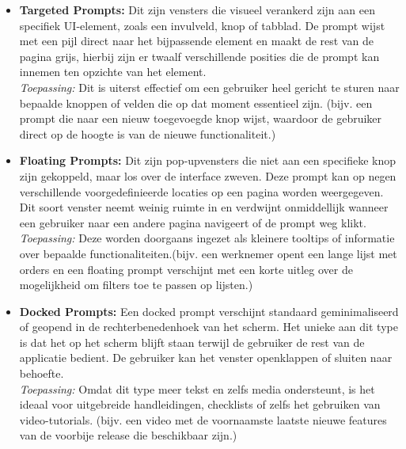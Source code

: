 \begin{itemize}
	\item \textbf{Targeted Prompts:} Dit zijn vensters die visueel verankerd zijn aan een specifiek UI-element, zoals een invulveld, knop of tabblad. De prompt wijst met een pijl direct naar het bijpassende element en maakt de rest van de pagina grijs, hierbij zijn er twaalf verschillende posities die de prompt kan innemen ten opzichte van het element. 
	\\
	
	\textit{Toepassing:} Dit is uiterst effectief om een gebruiker heel gericht te sturen naar bepaalde knoppen of velden die op dat moment essentieel zijn. (bijv. een prompt die naar een nieuw toegevoegde knop wijst, waardoor de gebruiker direct op de hoogte is van de nieuwe functionaliteit.)
	
	\item \textbf{Floating Prompts:} Dit zijn pop-upvensters die niet aan een specifieke knop zijn gekoppeld, maar los over de interface zweven. Deze prompt kan op negen verschillende voorgedefinieerde locaties op een pagina worden weergegeven. Dit soort venster neemt weinig ruimte in en verdwijnt onmiddellijk wanneer een gebruiker naar een andere pagina navigeert of de prompt weg klikt.
	\\
	
	\textit{Toepassing:} Deze worden doorgaans ingezet als kleinere tooltips of informatie over bepaalde functionaliteiten.(bijv. een werknemer opent een lange lijst met orders en een floating prompt verschijnt met een korte uitleg over de mogelijkheid om filters toe te passen op lijsten.)
	
	\item \textbf{Docked Prompts:} Een docked prompt verschijnt standaard geminimaliseerd of geopend in de rechterbenedenhoek van het scherm. Het unieke aan dit type is dat het op het scherm blijft staan terwijl de gebruiker de rest van de applicatie bedient. De gebruiker kan het venster openklappen of sluiten naar behoefte.
	\\
	
	\textit{Toepassing:} Omdat dit type meer tekst en zelfs media ondersteunt, is het ideaal voor uitgebreide handleidingen, checklists of zelfs het gebruiken van video-tutorials. (bijv. een video met de voornaamste laatste nieuwe features van de voorbije release die beschikbaar zijn.)
\end{itemize}
